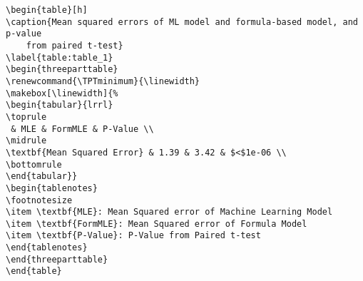 \documentclass[11pt]{article}
\begin{document}
\begin{Verbatim}[tabsize=4]
\begin{table}[h]
\caption{Mean squared errors of ML model and formula-based model, and p-value
	from paired t-test}
\label{table:table_1}
\begin{threeparttable}
\renewcommand{\TPTminimum}{\linewidth}
\makebox[\linewidth]{%
\begin{tabular}{lrrl}
\toprule
 & MLE & FormMLE & P-Value \\
\midrule
\textbf{Mean Squared Error} & 1.39 & 3.42 & $<$1e-06 \\
\bottomrule
\end{tabular}}
\begin{tablenotes}
\footnotesize
\item \textbf{MLE}: Mean Squared error of Machine Learning Model
\item \textbf{FormMLE}: Mean Squared error of Formula Model
\item \textbf{P-Value}: P-Value from Paired t-test
\end{tablenotes}
\end{threeparttable}
\end{table}

\end{Verbatim}
\end{document}
